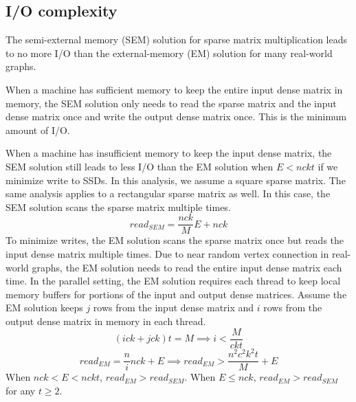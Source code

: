 
\subsection{I/O complexity}
The semi-external memory (SEM) solution for sparse matrix multiplication leads
to no more I/O than the external-memory (EM) solution for many real-world graphs.

When a machine has sufficient memory to keep the entire input dense matrix
in memory, the SEM solution only needs to read the sparse matrix and the input
dense matrix once and write the output dense matrix once. This is
the minimum amount of I/O.

When a machine has insufficient memory to keep the input dense matrix, the SEM
solution still leads to less I/O than the EM solution when $E < n c k t$ if we
minimize write to SSDs.
In this analysis, we assume a square sparse matrix. The same analysis applies
to a rectangular sparse matrix as well.
In this case, the SEM solution scans the sparse matrix multiple times.
\begin{equation*}
read_{SEM} = \frac{n c k}{M} E + n c k
\end{equation*}
To minimize writes, the EM solution
scans the sparse matrix once but reads the input dense matrix multiple times.
Due to near random vertex connection in real-world graphs, the EM solution needs to
read the entire input dense matrix each time. In the parallel setting,
the EM solution requires each thread to keep local memory buffers for portions
of the input and output dense matrices. Assume the EM solution keeps $j$ rows
from the input dense matrix and $i$ rows from the output dense matrix in memory
in each thread.
\begin{equation*}
(i c k + j c k) t = M \implies i < \frac{M}{c k t}
\end{equation*}
\begin{equation*}
read_{EM} = \frac{n}{i} n c k + E \implies  read_{EM} > \frac{n^2 c^2 k^2 t}{M} + E
\end{equation*}
When $n c k < E < n c k t$, $read_{EM} > read_{SEM}$.
When $E \leq n c k$, $read_{EM} > read_{SEM}$ for any $t \geq 2$.

